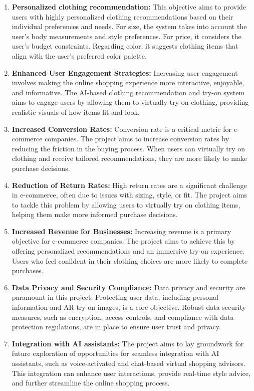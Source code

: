 	\begin{enumerate}
		\item \textbf{Personalized clothing recommendation:} This objective aims to provide users with highly personalized clothing recommendations based on their individual preferences and needs. For size, the system takes into account the user's body measurements and style preferences. For price, it considers the user's budget constraints. Regarding color, it suggests clothing items that align with the user's preferred color palette.
		\item \textbf{Enhanced User Engagement Strategies:} Increasing user engagement involves making the online shopping experience more interactive, enjoyable, and informative. The AI-based clothing recommendation and try-on system aims to engage users by allowing them to virtually try on clothing, providing realistic visuals of how items fit and look.
		\item \textbf{Increased Conversion Rates:} Conversion rate is a critical metric for e-commerce companies. The project aims to increase conversion rates by reducing the friction in the buying process. When users can virtually try on clothing and receive tailored recommendations, they are more likely to make purchase decisions.
		\item \textbf{Reduction of Return Rates:} High return rates are a significant challenge in e-commerce, often due to issues with sizing, style, or fit. The project aims to tackle this problem by allowing users to virtually try on clothing items, helping them make more informed purchase decisions.
		\item \textbf{Increased Revenue for Businesses:} Increasing revenue is a primary objective for e-commerce companies. The project aims to achieve this by offering personalized recommendations and an immersive try-on experience. Users who feel confident in their clothing choices are more likely to complete purchases.
		\item \textbf{Data Privacy and Security Compliance:} Data privacy and security are paramount in this project. Protecting user data, including personal information and AR try-on images, is a core objective. Robust data security measures, such as encryption, access controls, and compliance with data protection regulations, are in place to ensure user trust and privacy.
		\item \textbf{Integration with AI assistants:} The project aims to lay groundwork for future exploration of opportunities for seamless integration with AI assistants, such as voice-activated and chat-based virtual shopping advisors. This integration can enhance user interactions, provide real-time style advice, and further streamline the online shopping process.
	\end{enumerate}


